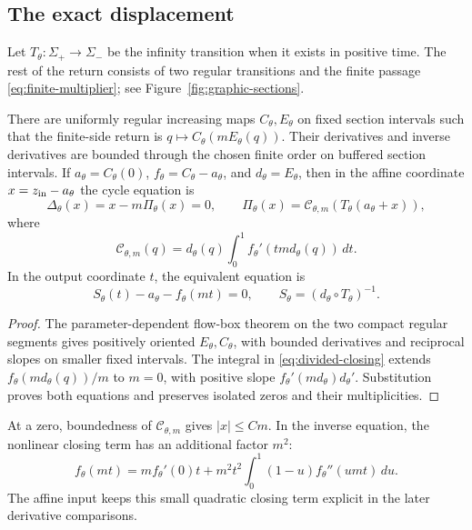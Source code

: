 \subsection{The exact displacement}

Let \(T_\theta:\Sigma_+\to\Sigma_-\) be the infinity transition when
it exists in positive time. The rest of the return consists of two
regular transitions and the finite passage
\eqref{eq:finite-multiplier}; see Figure~\ref{fig:graphic-sections}.

\begin{lemma}\label{lem:closing}
There are uniformly regular increasing maps \(C_\theta,E_\theta\)
on fixed section intervals such that the finite-side return is
\(q\mapsto C_\theta(mE_\theta(q))\). Their derivatives and inverse
derivatives are bounded through the chosen finite order on buffered
section intervals.
If \(a_\theta=C_\theta(0)\), \(f_\theta=C_\theta-a_\theta\),
and \(d_\theta=E_\theta\), then in the affine coordinate
\(x=z_{\rm in}-a_\theta\) the cycle equation is
\begin{equation}\label{eq:return}
 \Delta_\theta(x)=x-m\Pi_\theta(x)=0,\qquad
 \Pi_\theta(x)=\mathcal C_{\theta,m}(T_\theta(a_\theta+x)),
\end{equation}
where
\begin{equation}\label{eq:divided-closing}
 \mathcal C_{\theta,m}(q)=d_\theta(q)
       \int_0^1 f_\theta'(tm d_\theta(q))\,dt .
\end{equation}
In the output coordinate \(t\), the equivalent equation is
\begin{equation}\label{eq:inverse-return}
 S_\theta(t)-a_\theta-f_\theta(mt)=0,\qquad
 S_\theta=(d_\theta\circ T_\theta)^{-1}.
\end{equation}
\end{lemma}
\begin{proof}
The parameter-dependent flow-box theorem on the two compact regular
segments gives positively oriented \(E_\theta,C_\theta\), with bounded
derivatives and reciprocal slopes on smaller fixed intervals.
The integral in \eqref{eq:divided-closing} extends
\(f_\theta(md_\theta(q))/m\) to \(m=0\), with positive slope
\(f_\theta'(md_\theta)d_\theta'\). Substitution proves both equations
and preserves isolated zeros and their multiplicities.
\end{proof}

At a zero, boundedness of \(\mathcal C_{\theta,m}\) gives
\(|x|\le Cm\).
In the inverse equation, the nonlinear closing term has an additional
factor \(m^2\):
\begin{equation}\label{eq:closing-quadratic}
 f_\theta(mt)=mf_\theta'(0)t+
 m^2t^2\int_0^1(1-u)f_\theta''(umt)\,du .
\end{equation}
The affine input keeps this small quadratic closing term explicit in
the later derivative comparisons.

